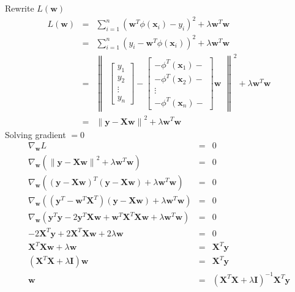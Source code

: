 \documentclass[12pt]{article}
\begin{document}
Rewrite $L(\textbf{w})$
\begin{eqnarray*}
  L(\textbf{w})
  &=& \sum_{i=1}^n (\textbf{w}^T \phi(\textbf{x}_i) - y_i)^2
  + \lambda \textbf{w}^T \textbf{w} \\
  &=& \sum_{i=1}^n (y_i - \textbf{w}^T \phi(\textbf{x}_i))^2
  + \lambda \textbf{w}^T \textbf{w} \\
  &=& \left\lVert 
  \begin{matrix}
    \begin{bmatrix}
      y_1 \\
      y_2 \\
      \vdots \\
      y_n
    \end{bmatrix}
    -
    \begin{bmatrix}
    - \phi^T(\textbf{x}_1)- \\
    - \phi^T(\textbf{x}_2)- \\
    \vdots \\
    -\phi^T(\textbf{x}_n)- 
    \end{bmatrix}
    \textbf{w}
  \end{matrix}
  \right\rVert^2 + \lambda \textbf{w}^T \textbf{w} \\
  &=& \left\lVert \textbf{y} - \textbf{Xw} \right\rVert^2
  + \lambda \textbf{w}^T \textbf{w}
\end{eqnarray*}
Solving gradient $=0$
\begin{eqnarray*}
  \nabla_{\textbf{w}} {L} &=& 0 \\
  \nabla_{\textbf{w}} {\left( 
      \left\lVert \textbf{y} - \textbf{Xw} \right\rVert^2 
      + \lambda \textbf{w}^T \textbf{w} \right)} &=& 0 \\
  \nabla_{\textbf{w}} {\left( \left(\textbf{y} - \textbf{Xw} \right)^T
      \left(\textbf{y} - \textbf{Xw} \right) 
      + \lambda \textbf{w}^T \textbf{w} \right)} &=& 0 \\
  \nabla_{\textbf{w}} {\left( 
      \left(\textbf{y}^T - \textbf{w}^T \textbf{X}^T \right)
      \left(\textbf{y} - \textbf{Xw} \right) 
      + \lambda \textbf{w}^T \textbf{w} \right)} &=& 0 \\
  \nabla_{\textbf{w}} {\left( 
      \textbf{y}^T \textbf{y} - 2 \textbf{y}^T \textbf{X} \textbf{w}
      + \textbf{w}^T \textbf{X}^T \textbf{Xw} 
      + \lambda \textbf{w}^T \textbf{w} \right)} &=& 0 \\
  - 2 \textbf{X}^T \textbf{y} + 2 \textbf{X}^T \textbf{Xw} 
  + 2 \lambda \textbf{w} &=& 0 \\
  \textbf{X}^T \textbf{Xw} + \lambda \textbf{w}
  &=& \textbf{X}^T \textbf{y} \\
  \left( \textbf{X}^T \textbf{X} + \lambda \textbf{I} \right) \textbf{w}
  &=& \textbf{X}^T \textbf{y} \\
  \textbf{w} &=&
  \left( \textbf{X}^T \textbf{X} + \lambda \textbf{I} \right)^{-1}
  \textbf{X}^T \textbf{y}
\end{eqnarray*}
\end{document}
